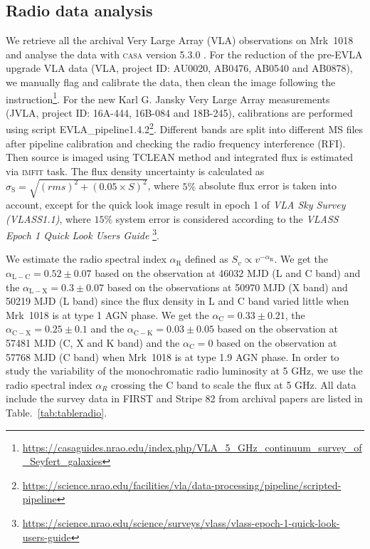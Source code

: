 \documentclass[twocolumn]{aastex63}
\begin{document}
\subsection{Radio data analysis}
\label{subsec:vla}
We retrieve all the archival Very Large Array (VLA) observations on Mrk~1018 and analyse the data with \textsc{casa} version 5.3.0 \citep{2007ASPC..376..127M}. For the reduction of the pre-EVLA upgrade VLA data (VLA, project ID: AU0020, AB0476, AB0540 and AB0878), we manually flag and calibrate the data, then clean the image following the instruction\footnote{\url{https://casaguides.nrao.edu/index.php/VLA_5_GHz_continuum_survey_of_Seyfert_galaxies}}. For the new Karl G. Jansky Very Large Array measurements (JVLA, project ID: 16A-444, 16B-084 and 18B-245), calibrations are performed using script {EVLA\_pipeline1.4.2}\footnote{\url{https://science.nrao.edu/facilities/vla/data-processing/pipeline/scripted-pipeline}}. Different bands are split into different MS files after pipeline calibration and checking the radio frequency interference (RFI). Then source is imaged using {\scriptsize TCLEAN} method and integrated flux is estimated via \textsc{imfit} task. The flux density uncertainty is calculated as $\sigma_\mathrm{S}=\sqrt{(rms)^2+(0.05\times S)^2}$, where $5 \%$ absolute flux error is taken into account, except for the quick look image result in epoch 1 of  {\em VLA Sky Survey (VLASS1.1)}, where $15 \%$ system error is considered according to the {\em VLASS Epoch 1 Quick Look Users Guide} \footnote{\url{https://science.nrao.edu/science/surveys/vlass/vlass-epoch-1-quick-look-users-guide}}. 

We estimate the radio spectral index $\alpha_\mathrm{R}$ defined as $S_v \propto v^{-\alpha_\mathrm{R}}$. We get the $\alpha_\mathrm{L-C} =0.52 \pm 0.07$ based on the observation at 46032 MJD (L and C band) and the $\alpha_\mathrm{L-X} =0.3 \pm 0.07$ based on the observations at 50970 MJD (X band) and 50219 MJD (L band) since the flux density in L and C band varied little when Mrk~1018 is at type 1 AGN phase. We get the $\alpha_\mathrm{C} =0.33\pm0.21$, the $\alpha_\mathrm{C-X} =0.25\pm0.1$ and the $\alpha_\mathrm{C-K} =0.03\pm0.05$ based on the observation at 57481 MJD (C, X and K band) and the $\alpha_\mathrm{C} =0$ based on the observation at 57768 MJD (C band) when Mrk~1018 is at type 1.9 AGN phase. In order to study the variability of the monochromatic radio luminosity at 5 GHz, we use the radio spectral index $\alpha_R$ crossing the C band to scale the flux at 5 GHz. All data include the survey data in FIRST \citep{1994ASPC...61..165B,1995ApJ...450..559B} and Stripe 82 \citep{2011AJ....142....3H} from archival papers are listed in Table.~\ref{tab:tableradio}. 
\end{document}
